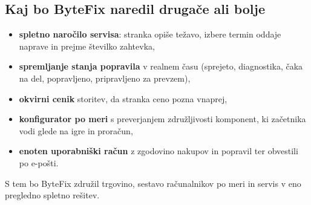 \documentclass[11pt,a4paper]{article}
\begin{document}
\subsection*{Kaj bo ByteFix naredil drugače ali bolje}
\begin{itemize}
  \item \textbf{spletno naročilo servisa}: stranka opiše težavo, izbere termin
        oddaje naprave in prejme številko zahtevka,
  \item \textbf{spremljanje stanja popravila} v realnem času (sprejeto,
        diagnostika, čaka na del, popravljeno, pripravljeno za prevzem),
  \item \textbf{okvirni cenik} storitev, da stranka ceno pozna vnaprej,
  \item \textbf{konfigurator po meri} s preverjanjem združljivosti komponent,
        ki začetnika vodi glede na igre in proračun,
  \item \textbf{enoten uporabniški račun} z zgodovino nakupov in popravil
        ter obvestili po e-pošti.
\end{itemize}

S tem bo ByteFix združil trgovino, sestavo računalnikov po meri in servis
v eno pregledno spletno rešitev.
\end{document}
